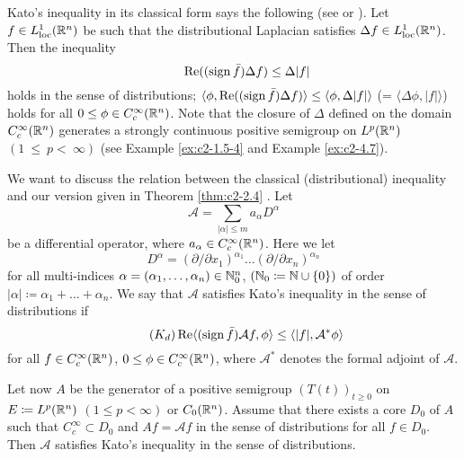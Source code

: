 \begin{example}\label{ex:c2-2.5}
%
%
%
Kato's inequality in its classical form says the following (see \citet{kato:1973} or \citet[X.27]{reedsimon:1975}).
Let $f \in L^1_{\text{loc}}(\mathbb{R}^n)$ be such that the distributional Laplacian satisfies $\Delta f \in L^1_{\text{loc}}(\mathbb{R}^n)$.
Then the inequality
\begin{equation*} \label{eq:c2-K-classic} \tag*{}
\mathop{}\!\mathrm{Re}((\operatorname{sign} \bar{f})\Delta f) \leq \Delta|f| 
\end{equation*}
holds in the sense of distributions; \ie
$\langle \phi, \mathop{}\!\mathrm{Re}((\operatorname{sign} \bar{f})\Delta f) \rangle \leq \langle \phi,\Delta|f| \rangle$ (= $\langle \Delta \phi,|f| \rangle$) holds for all $0 \leq \phi \in C_{c}^{\infty}(\mathbb{R}^n)$.
Note that the closure of $\Delta$ defined on the domain $C_{c}^{\infty}(\mathbb{R}^n)$ generates a strongly continuous positive semigroup on $L^p(\mathbb{R}^n)$ $(1~\leq~p <~\infty)$ (see Example \ref{ex:c2-1.5-4} and Example \ref{ex:c2-4.7}).
\end{example}
We want to discuss the relation between the classical (distributional) inequality and our version given in Theorem \ref{thm:c2-2.4} .
Let 
\[
\mathcal{A} = \sum_{|\alpha| \leq m} a_{\alpha} D^{\alpha}
\]
be a differential operator, where $a_{\alpha} \in C_{c}^{\infty}(\mathbb{R}^n)$.
Here we let 
\[
D^{\alpha} = (\partial/\partial x_1)^{\alpha_1} \ldots (\partial/\partial x_{n})^{\alpha_{n}}
\]
for all multi-indices $\alpha = (\alpha_1,\ldots,\alpha_{n}) \in \mathbb{N}_{0}^n$, 
$(\mathbb{N}_{0} \coloneqq \mathbb{N}\cup\{0\})$ of order $|\alpha| \coloneqq \alpha_1 + \ldots + \alpha_{n}$.
We say that $\mathcal{A}$ satisfies Kato's inequality in the sense of distributions if
\begin{equation}\label{eq:c2-Kd} \tag{$K_{d}$}
\Re\langle(\sign \bar{f})\mathcal{A}f, \phi \rangle \leq \langle|f|, \mathcal{A}^{*}\phi \rangle
\end{equation}
for all $f \in C_{c}^{\infty}(\mathbb{R}^n)$, $0 \leq \phi \in C_{c}^{\infty}(\mathbb{R}^n)$, where $\mathcal{A}^{*}$ denotes the formal adjoint of $\mathcal{A}$. 

Let now $A$ be the generator of a positive semigroup $(T(t))_{t \geq 0}$ on $E \coloneqq L^p(\mathbb{R}^n)$ $(1 \leq p < \infty)$ or $C_{0}(\mathbb{R}^n)$.
Assume that there exists a core
$D_{0}$ of $A$ such that $C_{c}^{\infty} \subset D_{0}$ and $Af = \mathcal{A}f$ in the sense of distributions for all $f \in D_{0}$.
Then $\mathcal{A}$ satisfies Kato's inequality in the sense of distributions.

